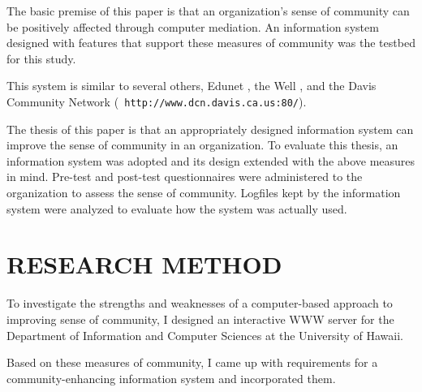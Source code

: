 The basic premise of this paper is that an organization's sense of community
can be positively affected through computer mediation.  An information system
designed with features that support these measures of community was the testbed
for this study.

This system is similar to several others, Edunet \cite{Wolpert91}, the Well
\cite{Rheingold93}, and the Davis Community Network ({\tt
http://www.dcn.davis.ca.us:80/}).

The thesis of this paper is that an appropriately designed information
system can improve the sense of community in an organization.  To evaluate this
thesis, an information system was adopted and its design extended with the
above measures in mind.  Pre-test and post-test questionnaires were
administered to the organization to assess the sense of community.  Logfiles
kept by the information system were analyzed to evaluate how the system was
actually used.

\section{RESEARCH METHOD}

To investigate the strengths and weaknesses of a computer-based approach to
improving sense of community, I designed an interactive WWW server for the
Department of Information and Computer Sciences at the University of Hawaii.

Based on these measures of community, I came up with requirements for a
community-enhancing information system and incorporated them.  



